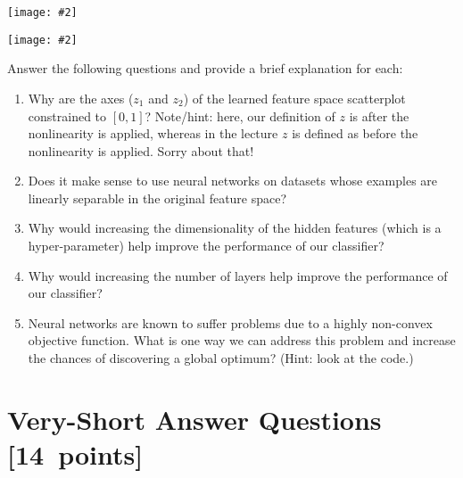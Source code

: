 \documentclass{article}
\newcommand{\blu}[1]{{\textcolor{blu}{#1}}}
\let\ask\blu
\newcommand\pts[1]{\textcolor{pointscolour}{[#1~points]}}
\newcommand{\centerfig}[2]{\begin{center}\texttt{[image: \#2]}\end{center}}
\begin{document}
\centerfig{.7}{./figs/sinusoids_decision_boundary_[2, 2]_2.png}
\centerfig{.7}{./figs/sinusoids_linear_boundary_[2, 2]_2.png}

\ask{Answer the following questions and provide a brief explanation for each:}

\begin{enumerate}
	\item Why are the axes ($z_1$ and $z_2$) of the learned feature space scatterplot constrained to $[0, 1]$? Note/hint: here, our definition of $z$ is after the nonlinearity is applied, whereas in the lecture $z$ is defined as before the nonlinearity is applied. Sorry about that! 
	\item Does it make sense to use neural networks on datasets whose examples are linearly separable in the original feature space?
	\item Why would increasing the dimensionality of the hidden features (which is a hyper-parameter) help improve the performance of our classifier?
	\item Why would increasing the number of layers help improve the performance of our classifier?
	\item Neural networks are known to suffer problems due to a highly non-convex objective function. What is one way we can address this problem and increase the chances of discovering a global optimum? (Hint: look at the code.)
\end{enumerate}


\section{Very-Short Answer Questions \pts{14}}
\end{document}
